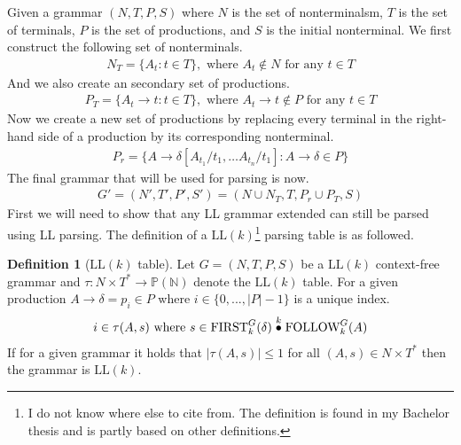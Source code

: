 \documentclass[a4paper,12pt]{article}
\newcommand{\truncprod}[1]{\stackrel{\mathclap{#1}}{\bullet}}
\newcommand\LL{\text{LL}}
\newcommand\FIRST{\text{FIRST}}
\newcommand\FOLLOW{\text{FOLLOW}}
\theoremstyle{definition}
\newtheorem{definition}{Definition}[section]
\begin{document}
Given a grammar $(N, T, P, S)$ where $N$ is the set of nonterminalsm, $T$ is the set of terminals, $P$ is the set of productions, and $S$ is the initial nonterminal. We first construct the following set of nonterminals.
\begin{align*}
  N_{T} = \{A_t : t \in T\}, \text{ where } A_t \notin N \text{ for any } t \in T
\end{align*}
And we also create an secondary set of productions.
\begin{align*}
  P_{T} = \{A_t \to t : t \in T\}, \text{ where } A_t \to t \notin P \text{ for any } t \in T
\end{align*}
Now we create a new set of productions by replacing every terminal in the right-hand side of a production by its corresponding nonterminal.
\begin{align*}
  P_r = \{A \to \delta[A_{t_1}/t_1, \dots A_{t_n}/t_1] : A \to \delta \in P\}
\end{align*}
The final grammar that will be used for parsing is now.
\begin{align*}
  G' = (N', T', P', S') = (N \cup N_T, T, P_r \cup P_T, S)
\end{align*}
First we will need to show that any LL grammar extended can still be parsed using LL parsing. The definition of a $\LL(k)$\footnote{I do not know where else to cite from. The definition is found in my Bachelor thesis and is partly based on other definitions.} \cite{due2023} parsing table is as followed.
\begin{definition}[$\LL(k)$ table]
  Let $G = (N, T, P, S)$ be a $\LL(k)$ context-free grammar and $\tau : N \times T^* \to \mathbb{P}(\mathbb{N})$ denote the $\LL(k)$ table. For a given production $A \to \delta = p_i \in P$ where $i \in \{0, ..., |P| - 1\}$ is a unique index.
  \begin{gather*}
      i \in \tau(A, s) \text{ where } s \in \FIRST^G_k(\delta) \truncprod{k} \FOLLOW^G_k(A)
  \end{gather*}
  If for a given grammar it holds that $|\tau(A, s)| \leq 1$ for all $(A, s) \in N \times T^*$ then the grammar is $\LL(k)$.
\end{definition}
\end{document}
